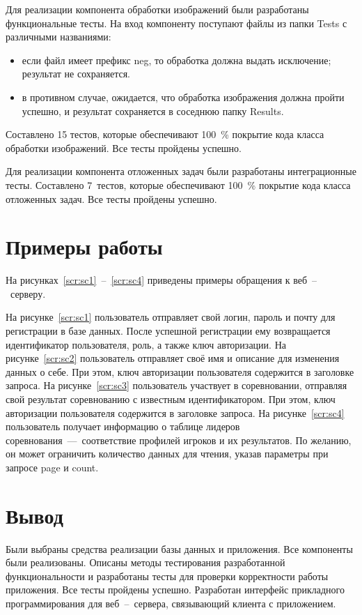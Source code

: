 Для реализации компонента обработки изображений были разработаны функциональные тесты. На вход компоненту поступают файлы из папки Tests с различными названиями:
\begin{itemize}
	\item если файл имеет префикс neg, то обработка должна выдать исключение; результат не сохраняется.
	\item в противном случае, ожидается, что обработка изображения должна пройти успешно, и результат сохраняется в соседнюю папку Results.
\end{itemize}
Составлено 15 тестов, которые обеспечивают 100~\% покрытие кода класса обработки изображений. Все тесты пройдены успешно.

Для реализации компонента отложенных задач были разработаны интеграционные тесты. Составлено 7~тестов, которые обеспечивают 100~\% покрытие кода класса отложенных задач. Все тесты пройдены успешно.

\section{Примеры работы}
На рисунках~\ref{scr:sc1}~--~\ref{scr:sc4} приведены примеры обращения к веб~--~серверу.

На рисунке~\ref{scr:sc1} пользователь отправляет свой логин, пароль и почту для регистрации в базе данных. После успешной регистрации ему возвращается идентификатор пользователя, роль, а также ключ авторизации. 
\FloatBarrier
На рисунке~\ref{scr:sc2} пользователь отправляет своё имя и описание для изменения данных о себе. При этом, ключ авторизации пользователя содержится в заголовке запроса.
\FloatBarrier
На рисунке~\ref{scr:sc3} пользователь участвует в соревновании, отправляя свой результат соревнованию с известным идентификатором. При этом, ключ авторизации пользователя содержится в заголовке запроса.
\FloatBarrier
На рисунке~\ref{scr:sc4} пользователь получает информацию о таблице лидеров соревнования~---~соответствие профилей игроков и их результатов. По желанию, он может ограничить количество данных для чтения, указав параметры при запросе page и count.
\FloatBarrier

\section*{Вывод}

Были выбраны средства реализации базы данных и приложения. Все компоненты были реализованы. Описаны методы тестирования разработанной функциональности и разработаны тесты для проверки корректности работы приложения. Все тесты пройдены успешно. Разработан интерфейс прикладного программирования для веб~--~сервера, связывающий клиента с приложением.

\clearpage
